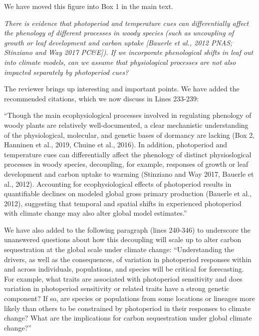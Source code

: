 \documentclass{article}
\begin{document}
\par We have moved this figure into Box 1 in the main text.

\par \emph{There is evidence that photoperiod and temperature cues can differentially affect the phenology of different processes in woody species (such as uncoupling of growth or leaf development and carbon uptake [Bauerle et al., 2012 PNAS; Stinziano and Way 2017 PC\&E]). If we incorporate phenological shifts in leaf out into climate models, can we assume that physiological processes are not also impacted separately by photoperiod cues?} 

\par  The reviewer brings up interesting and important points. We have added the recommended citations, which we now discuss in Lines 233-239:

``Though the main ecophysiological processes involved in regulating phenology of woody plants are relatively well-documented, a clear mechanistic understanding of the physiological, molecular, and genetic bases of dormancy are lacking (Box 2, Hanninen et al., 2019, Chuine et al., 2016). In addition, photoperiod and temperature cues can differentially affect the phenology of distinct physioslogical processes in woody species, decoupling, for example, responses of growth or leaf development and carbon uptake to warming (Stinziano and Way 2017, Bauerle et al., 2012). Accounting for ecophysiological effects of photoperiod results in quantifiable declines on modeled global gross primary production (Bauerle et al., 2012), suggesting that temporal and spatial shifts in experienced photoperiod with climate change may also alter global model estimates.''

\par We have also added to the following paragraph (lines 240-346) to underscore the unanswered questions about how this decoupling will scale up to alter carbon sequestration at the global scale under climate change:
``Understanding the drivers, as well as the consequences, of variation in photoperiod responses within and across individuals, populations, and species will be critical for forecasting.  For example, what traits are associated with photoperiod sensitivity and does variation in photoperiod sensitivity or related traits have a strong genetic component? If so, are species or populations from some locations or lineages more likely than others to be constrained by photoperiod in their responses to climate change? What are the implications for carbon sequestration under global climate change?''
\end{document}
